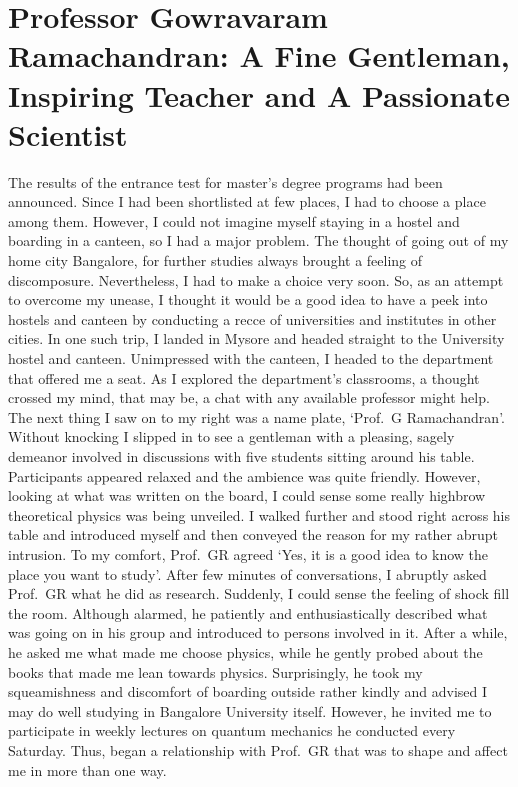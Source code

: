 \chapter[A Fine Gentleman, Inspiring Teacher and A Passionate Scientist]{Professor Gowravaram Ramachandran: A Fine Gentleman, Inspiring Teacher and A Passionate Scientist}\label{chap31}


The results of the entrance test for master's degree programs had been announced.
Since I had been shortlisted at few places, I had to choose a place among them.
However, I could not imagine myself staying in a hostel and boarding in a
canteen, so I had a major problem. The thought of going out of my home city
Bangalore, for further studies always brought a feeling of discomposure.
Nevertheless, I had to make a choice very soon. So, as an attempt to overcome
my unease, I thought it would be a good idea to have a peek into hostels and
canteen by conducting a recce of universities and institutes in other cities. In one
such trip, I landed in Mysore and headed straight to the University hostel and
canteen. Unimpressed with the canteen, I headed to the department that offered
me a seat. As I explored the department's classrooms, a thought crossed my mind,
that may be, a chat with any available professor might help. The next thing I saw
on to my right was a name plate, `Prof.\ G Ramachandran'. Without knocking I
slipped in to see a gentleman with a pleasing, sagely demeanor involved in
discussions with five students sitting around his table. Participants appeared
relaxed and the ambience was quite friendly. However, looking at what was
written on the board, I could sense some really highbrow theoretical physics was
being unveiled. I walked further and stood right across his table and introduced
myself and then conveyed the reason for my rather abrupt intrusion. To my
comfort, Prof.\ GR agreed `Yes, it is a good idea to know the place you want to
study'. After few minutes of conversations, I abruptly asked Prof.\ GR what he did
as research. Suddenly, I could sense the feeling of shock fill the room. Although
alarmed, he patiently and enthusiastically described what was going on in his
group and introduced to persons involved in it. After a while, he asked me what
made me choose physics, while he gently probed about the books that made me 
lean towards physics. Surprisingly, he took my squeamishness and discomfort of
boarding outside rather kindly and advised I may do well studying in Bangalore
University itself. However, he invited me to participate in weekly lectures on
quantum mechanics he conducted every Saturday. Thus, began a relationship
with Prof.\ GR that was to shape and affect me in more than one way.

